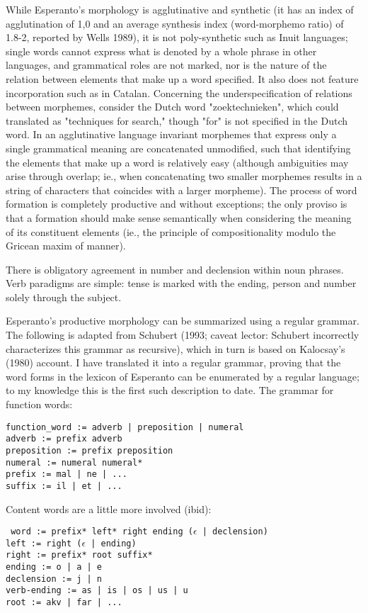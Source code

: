 \documentclass[10pt,a4paper]{article}
\begin{document}
While Esperanto's morphology is agglutinative and synthetic (it has an index of
agglutination of 1,0 and an average synthesis index (word-morphemo ratio) of
1.8-2, reported by Wells 1989), it is not poly-synthetic such as Inuit
languages; single words cannot express what is denoted by a whole phrase
in other languages, and grammatical roles are not marked, nor is the nature of
the relation between elements that make up a word specified. It also does not
feature incorporation such as in Catalan. Concerning the underspecification of
relations between morphemes, consider the Dutch word "zoektechnieken", which
could translated as "techniques for search," though "for" is not specified in
the Dutch word. In an agglutinative language invariant morphemes that express
only a single grammatical meaning are concatenated unmodified, such that
identifying the elements that make up a word is relatively easy (although
ambiguities may arise through overlap; ie., when concatenating two smaller
morphemes results in a string of characters that coincides with a larger
morpheme). The process of word formation is completely productive and without
exceptions; the only proviso is that a formation should make sense
semantically when considering the meaning of its constituent elements (ie.,
the principle of compositionality modulo the Gricean maxim of manner). 

There is obligatory agreement in number and declension within noun phrases.
Verb paradigms are simple: tense is marked with the ending, person and number
solely through the subject.

Esperanto's productive morphology can be summarized using a regular
grammar. The following is adapted from Schubert (1993; caveat lector: Schubert
incorrectly characterizes this grammar as recursive), which in turn is based
on Kalocsay's (1980) account. I have translated it into a regular grammar,
proving that the word forms in the lexicon of Esperanto can be enumerated by a
regular language; to my knowledge this is the first such description to date.
The grammar for function words: 

\begin{verbatim}
function_word := adverb | preposition | numeral
adverb := prefix adverb
preposition := prefix preposition
numeral := numeral numeral*
prefix := mal | ne | ...
suffix := il | et | ...
\end{verbatim}

Content words are a little more involved (ibid):

\texttt{
word := prefix* left* right ending ($\epsilon$ | declension) \\
left := right ($\epsilon$ | ending) \\
right := prefix* root suffix* \\
ending := o | a | e \\
declension := j | n \\
verb-ending := as | is | os | us | u \\
root := akv | far | ...
}
\end{document}
